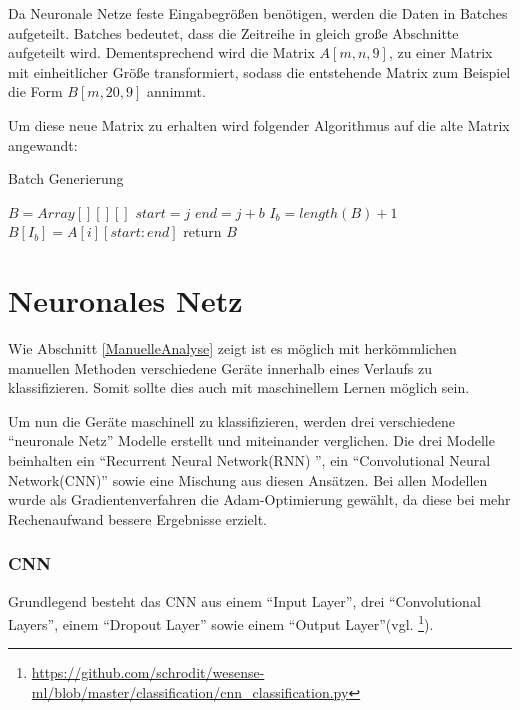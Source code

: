    Da Neuronale Netze feste Eingabegrößen benötigen, werden die Daten in Batches aufgeteilt.
    Batches bedeutet, dass die Zeitreihe in gleich große Abschnitte aufgeteilt wird.
    Dementsprechend wird die Matrix \( A[m, n, 9] \), zu einer Matrix mit einheitlicher Größe transformiert, sodass die entstehende Matrix zum Beispiel die Form \( B[m, 20, 9] \) annimmt.
    \newline

    \noindent
    Um diese neue Matrix zu erhalten wird folgender Algorithmus auf die alte Matrix angewandt:

    \begin{algorithm}\label{alg:BatchGenerierung}
        \caption{Batch Generierung}
        \begin{algorithmic}[1]
        \State{}
            \State ${B} = Array[][][]$
                    \State $start = j$
                    \State $end = j + b$ 
                    \State $I_b = length(B) + 1$
                    \State $B[I_b] = A[i][start : end]$
                \EndFor
            \EndFor
            \State return $B$
        \EndFunction
        \end{algorithmic}
    \end{algorithm}

\section{Neuronales Netz}
    Wie Abschnitt \ref{ManuelleAnalyse} zeigt ist es möglich mit herkömmlichen manuellen Methoden verschiedene Geräte innerhalb eines Verlaufs zu klassifizieren.
    Somit sollte dies auch mit maschinellem Lernen möglich sein.
    \newline

    \noindent
    Um nun die Geräte maschinell zu klassifizieren, werden drei verschiedene "`neuronale Netz"' Modelle erstellt und miteinander verglichen.
    Die drei Modelle beinhalten ein "`Recurrent Neural Network(RNN) "', ein "`Convolutional Neural Network(CNN)"' sowie eine Mischung aus diesen Ansätzen. 
    Bei allen Modellen wurde als Gradientenverfahren die Adam-Optimierung gewählt, da diese bei mehr Rechenaufwand bessere Ergebnisse erzielt.    

    \subsubsection{CNN}
    Grundlegend besteht das \ac{CNN} aus einem "`Input Layer"', drei "`Convolutional Layers"', einem "`Dropout Layer"' sowie einem "`Output Layer"'(vgl. \footnote{\url{https://github.com/schrodit/wesense-ml/blob/master/classification/cnn_classification.py}}).
    \newline

